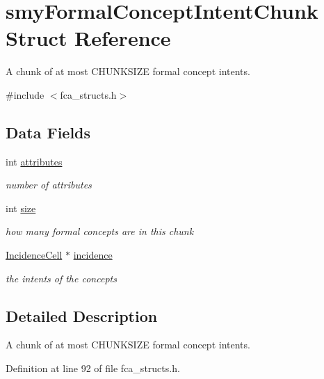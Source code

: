 \hypertarget{structsmyFormalConceptIntentChunk}{\section{smy\-Formal\-Concept\-Intent\-Chunk \-Struct \-Reference}
\label{structsmyFormalConceptIntentChunk}
}


\-A chunk of at most \-C\-H\-U\-N\-K\-S\-I\-Z\-E formal concept intents.  




{\ttfamily \#include $<$fca\-\_\-structs.\-h$>$}

\subsection*{\-Data \-Fields}
\begin{DoxyCompactItemize}
\item 
int \hyperlink{structsmyFormalConceptIntentChunk_a5246108db3d065d2b9c46fedfc88dc0e}{attributes}
\begin{DoxyCompactList}\small\item\em number of attributes \end{DoxyCompactList}\item 
int \hyperlink{structsmyFormalConceptIntentChunk_a39483f44afbcd1de56c41243c7a442aa}{size}
\begin{DoxyCompactList}\small\item\em how many formal concepts are in this chunk \end{DoxyCompactList}\item 
\hyperlink{fca_8h_a92fa84ef7a12663bb998f141ab729056}{\-Incidence\-Cell} $\ast$ \hyperlink{structsmyFormalConceptIntentChunk_a1777b5eadbd74c4659580968817b3424}{incidence}
\begin{DoxyCompactList}\small\item\em the intents of the concepts \end{DoxyCompactList}\end{DoxyCompactItemize}


\subsection{\-Detailed \-Description}
\-A chunk of at most \-C\-H\-U\-N\-K\-S\-I\-Z\-E formal concept intents. 

\-Definition at line 92 of file fca\-\_\-structs.\-h.



